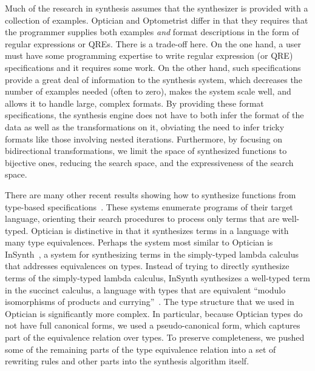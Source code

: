 \documentclass[acmsmall,review,anonymous]{acmart}
\begin{document}
Much of the research in synthesis assumes that the synthesizer is provided with
a collection of examples. Optician and Optometrist differ in that they requires
that the programmer supplies both examples {\em and} format descriptions in the
form of regular expressions or QREs.  There is a trade-off here.  On the one
hand, a user must have some programming expertise to write regular expression
(or QRE) specifications and it requires some work. On the other hand, such
specifications provide a great deal of information to the synthesis system,
which decreases the number of examples needed (often to zero), makes the system
scale well, and allows it to handle large, complex formats.  By providing these
format specifications, the synthesis engine does not have to both infer the
format of the data as well as the transformations on it, obviating the need to
infer tricky formats like those involving nested iterations. Furthermore, by
focusing on bidirectional transformations, we limit the space of synthesized
functions to bijective ones, reducing the search space, and the expressiveness
of the search space.

There are many other recent results showing how to synthesize functions from
type-based
specifications~\cite{augustsson-2004,osera+:pldi15,feser-pldi-2015,scherer-icfp-2015,frankle+:popl16,armando+:pldi16}.
These systems enumerate programs of their target language, orienting their
search procedures to process only terms that are well-typed.
Optician is distinctive in that it synthesizes terms in a language with many
type equivalences.
Perhaps the system most similar to Optician is InSynth~\cite{gvero-pldi-2013}, a
system for synthesizing terms in the simply-typed lambda calculus that addresses
equivalences on types. Instead of trying to directly synthesize terms of the
simply-typed lambda calculus, InSynth synthesizes a well-typed term
in the succinct calculus, a language with types
that are equivalent ``modulo isomorphisms of products and
currying''~\cite{gvero-pldi-2013}. The type structure that we used in Optician
is significantly more complex.  In particular, because Optician types do not
have full canonical forms, we used a pseudo-canonical form, which captures part
of the equivalence relation over types. To preserve completeness, we pushed
some of the remaining parts of the type equivalence relation into a set of
rewriting rules and other parts into the synthesis algorithm itself.
\end{document}
